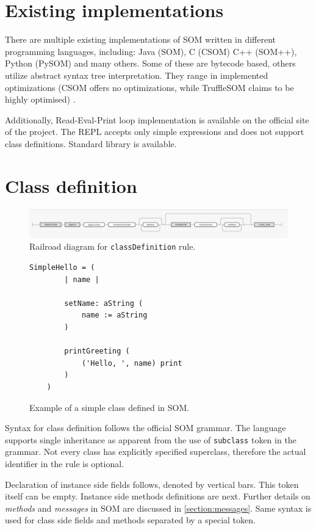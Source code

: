 \documentclass[thesis=M,english]{FITthesis}[2019/12/23]
\begin{document}
\section{Existing implementations}
There are multiple existing implementations of SOM written in different programming languages, including: Java (SOM), C (CSOM) C++ (SOM++), Python (PySOM) and
many others. Some of these are bytecode based, others utilize abstract syntax tree interpretation. They range in implemented optimizations (CSOM offers no 
optimizations, while TruffleSOM claims to be highly optimised) \cite{som-github}.

Additionally, Read-Eval-Print loop implementation is available on the official site of the project. The REPL accepts only simple expressions and does
not support class definitions. Standard library is available. \cite{som-github}

\section{Class definition}
\begin{figure}[h!]
	\centering
	\includegraphics[width=\textwidth]{media/grammar/classDefinition_rrd.png}
	\caption{Railroad diagram for \texttt{classDefinition} rule.}
	\label{fig:classDefinition_rrd}
\end{figure}

\begin{figure}[h!]
\begin{lstlisting}[language=Smalltalk]
	SimpleHello = (
		| name |

		setName: aString (
			name := aString
		)

		printGreeting (
			('Hello, ', name) print
		)
	)
\end{lstlisting}
\caption{Example of a simple class defined in SOM.}
\label{fig:hello_example}
\end{figure}

Syntax for class definition follows the official SOM grammar. The language supports single inheritance as apparent from the use
of \texttt{subclass} token in the grammar. Not every class has explicitly specified superclass, therefore the actual identifier in
the rule is optional.

Declaration of instance side fields follows, denoted by vertical bars. This token itself can be empty. Instance side methods definitions
are next. Further details on \textit{methods} and \textit{messages} in SOM are discussed in \ref{section:messages}.
Same syntax is used for class side fields and methods separated by a special token.
\end{document}
